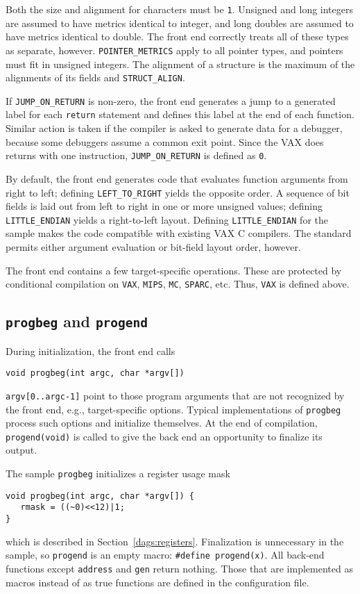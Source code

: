 Both the size and alignment for characters must be \verb|1|.
Unsigned and long integers are assumed to have metrics
identical to integer, and long doubles are assumed to have metrics
identical to double. The front end correctly treats all of these types
as separate, however.
\verb|POINTER_METRICS| apply to all pointer types, and pointers
must fit in unsigned integers.
The alignment of a structure is the maximum of the alignments
of its fields and \verb|STRUCT_ALIGN|.

If \verb|JUMP_ON_RETURN| is non-zero, the front end generates a jump to
a generated label for each \verb|return| statement and defines this
label at the end of each function.  Similar action is taken if the
compiler is asked to generate data for a debugger, because some
debuggers assume a common exit point.  Since the VAX does returns with
one instruction, \verb|JUMP_ON_RETURN| is defined as \verb|0|.

By default, the front end generates code that evaluates function
arguments from right to left;
defining \verb|LEFT_TO_RIGHT| yields the opposite order.
A sequence of bit fields is laid out from left to right
in one or more unsigned values; defining \verb|LITTLE_ENDIAN|
yields a right-to-left layout.
Defining \verb|LITTLE_ENDIAN| for the sample
makes the code compatible with existing VAX C compilers.
The standard permits either argument evaluation
or bit-field layout order, however.

The front end contains a few target-specific operations.
These are protected by conditional compilation on \verb|VAX|,
\verb|MIPS|, \verb|MC|, \verb|SPARC|, etc. Thus, \verb|VAX| is defined above.

\subsection{{\tt progbeg} and \tt progend}

\label{progbeg}\label{progend}
During initialization, the front end calls
\begin{verbatim}
void progbeg(int argc, char *argv[])
\end{verbatim}
\verb|argv[0..argc-1]| point
to those program arguments that are not recognized by the front end,
e.g., target-specific options.
Typical implementations of \verb|progbeg| process such
options and initialize themselves.
At the end of compilation, \verb|progend(void)| is called to give
the back end an opportunity to finalize its output.

The sample \verb|progbeg| initializes a register usage mask
\begin{verbatim}
void progbeg(int argc, char *argv[]) {
   rmask = ((~0)<<12)|1;
}
\end{verbatim}
which is described in Section~\ref{dags:registers}.
Finalization is unnecessary in the sample, so \verb|progend| is an empty macro:
\verb|#define progend(x)|.
All back-end functions except \verb|address| and \verb|gen| return nothing.
Those that are implemented as macros instead
of as true functions are defined in the configuration file.


